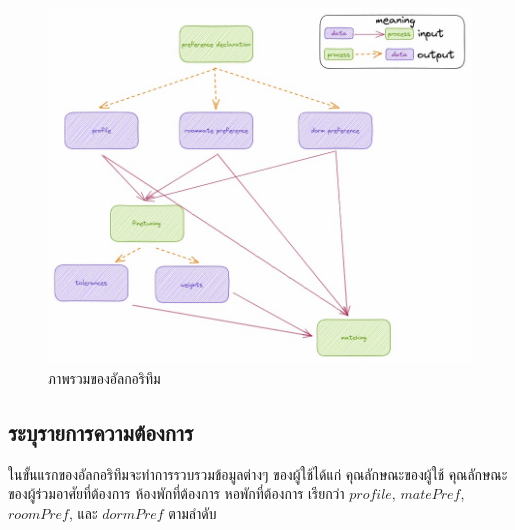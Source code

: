 \begin{figure}[ht]
  \begin{center}
    \includegraphics[width=\linewidth]{photo/diagram/matching-flow.jpeg}
  \end{center}
  \caption{ภาพรวมของอัลกอริทึม}
  \label{fig:match-overall}
\end{figure}

\subsection{ระบุรายการความต้องการ}
ในขั้นแรกของอัลกอริทึมจะทำการรวบรวมข้อมูลต่างๆ ของผู้ใช้ได้แก่ 
คุณลักษณะของผู้ใช้ คุณลักษณะของผู้ร่วมอาศัยที่ต้องการ ห้องพักที่ต้องการ หอพักที่ต้องการ เรียกว่า $\mathit{profile}$, $\mathit{matePref}$, $\mathit{roomPref}$,
และ $\mathit{dormPref}$ ตามลำดับ

